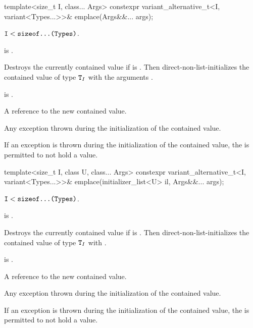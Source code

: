 %
\begin{itemdecl}
template<size_t I, class... Args>
  constexpr variant_alternative_t<I, variant<Types...>>& emplace(Args&&... args);
\end{itemdecl}

\begin{itemdescr}  %
\pnum
\mandates
$\texttt{I} < \texttt{sizeof...(Types)}$.

\pnum
\constraints
{} is .

\pnum
\effects
Destroys the currently contained value if 
is .
Then direct-non-list-initializes the contained value of type $\texttt{T}_I$
with the arguments .

\pnum
\ensures
{} is .

\pnum
\returns
A reference to the new contained value.

\pnum
\throws
Any exception thrown during the initialization of the contained value.

\pnum
\remarks
If an exception is thrown during the initialization of the contained value,
the  is permitted to not hold a value.
\end{itemdescr}

%
\begin{itemdecl}
template<size_t I, class U, class... Args>
  constexpr variant_alternative_t<I, variant<Types...>>&
    emplace(initializer_list<U> il, Args&&... args);
\end{itemdecl}

\begin{itemdescr}  %
\pnum
\mandates
$\texttt{I} < \texttt{sizeof...(Types)}$.

\pnum
\constraints
{} is .

\pnum
\effects
Destroys the currently contained value if 
is .
Then direct-non-list-initializes the contained value of type $\texttt{T}_I$
with .

\pnum
\ensures
{} is .

\pnum
\returns
A reference to the new contained value.

\pnum
\throws
Any exception thrown during the initialization of the contained value.

\pnum
\remarks
If an exception is thrown during the initialization of the contained value,
the  is permitted to not hold a value.
\end{itemdescr}

